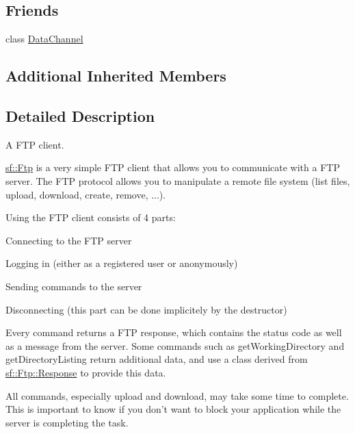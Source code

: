 \subsection*{Friends}
\begin{DoxyCompactItemize}
\item 
class \hyperlink{classsf_1_1_ftp_a8dee57337b6a7e183bfe21d178757b0c}{Data\-Channel}
\end{DoxyCompactItemize}
\subsection*{Additional Inherited Members}


\subsection{Detailed Description}
A F\-T\-P client. 

\hyperlink{classsf_1_1_ftp}{sf\-::\-Ftp} is a very simple F\-T\-P client that allows you to communicate with a F\-T\-P server. The F\-T\-P protocol allows you to manipulate a remote file system (list files, upload, download, create, remove, ...).

Using the F\-T\-P client consists of 4 parts\-: \begin{DoxyItemize}
\item Connecting to the F\-T\-P server \item Logging in (either as a registered user or anonymously) \item Sending commands to the server \item Disconnecting (this part can be done implicitely by the destructor)\end{DoxyItemize}
Every command returns a F\-T\-P response, which contains the status code as well as a message from the server. Some commands such as get\-Working\-Directory and get\-Directory\-Listing return additional data, and use a class derived from \hyperlink{classsf_1_1_ftp_1_1_response}{sf\-::\-Ftp\-::\-Response} to provide this data.

All commands, especially upload and download, may take some time to complete. This is important to know if you don't want to block your application while the server is completing the task.

